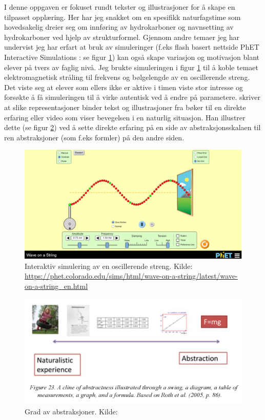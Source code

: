 \documentclass[main.tex]{subfiles}
\begin{document}
I denne oppgaven er fokuset rundt tekster og illustrasjoner for å skape en tilpasset opplæring. Her har jeg snakket om en spesifikk naturfagstime som hovedsakelig dreier seg om innføring av hydrokarboner og navnsetting av hydrokarboner ved hjelp av strukturformel. Gjennom andre temaer jeg har undervist jeg har erfart at bruk av simuleringer (f.eks flash basert nettside PhET Interactive Simulations : se figur \ref{fig:wave}) kan også skape variasjon og motivasjon blant elever på tvers av faglig nivå. Jeg brukte simuleringen i figur \ref{fig:wave} til å koble temaet elektromagnetisk stråling til frekvens og bølgelengde av en oscillerende streng. Det viste seg at elever som ellers ikke er aktive i timen viste stor intresse og forsøkte å få simuleringen til å virke autentisk ved å endre på parametere.  skriver at slike representasjoner binder tekst og illustrasjoner fra bøker til en direkte erfaring eller video som viser bevegelsen i en naturlig situasjon. Han illustrer dette (se figur \ref{fig:knain}) ved å sette direkte erfaring på en side av abstraksjonsskalaen til ren abstraksjoner (som f.eks formler) på den andre siden.
\begin{figure}[h!]
\centering
\includegraphics[scale = 0.25]{../figures/wave.png}
\caption{Interaktiv simulering av en oscillerende streng. Kilde: 
\protect\url{https://phet.colorado.edu/sims/html/wave-on-a-string/latest/wave-on-a-string_en.html}}
\label{fig:wave}
\end{figure}

\begin{figure}[h!]
\centering
\includegraphics[scale = 0.6]{../figures/knain.png}
\caption{Grad av abstraksjoner. Kilde: \protect{}}
\label{fig:knain}
\end{figure}
\end{document}
